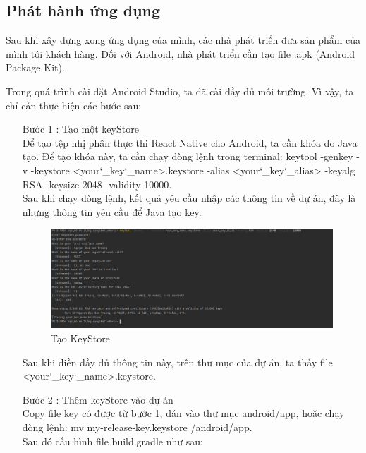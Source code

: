 \subsection{Phát hành ứng dụng}
    Sau khi xây dựng xong ứng dụng của mình, các nhà phát triển đưa sản phẩm của mình tới khách hàng. Đối với Android, nhà phát triển cần tạo file .apk (Android Package Kit).

    Trong quá trình cài đặt Android Studio, ta đã cài đầy đủ môi trường. Vì vậy, ta chỉ cần thực hiện các bước sau:
    \begin{enumerate}
        \item[Bước 1]: Tạo một keyStore\\
        Để tạo tệp nhị phân thực thi React Native cho Android, ta cần khóa do Java tạo. Để tạo khóa này, ta cần chạy dòng lệnh trong terminal: keytool -genkey -v -keystore <your\char`_key\char`_name>.keystore -alias <your\char`_key\char`_alias> -keyalg RSA -keysize 2048 -validity 10000.\\
        Sau khi chạy dòng lệnh, kết quả yêu cầu nhập các thông tin về dự án, đây là nhưng thông tin yêu cầu để Java tạo key.\\
        \begin{figure}[!ht]
            \centering
            \includegraphics[width=1\textwidth]{images/genkeystore.png}
            \caption{Tạo KeyStore}
        \end{figure}
        Sau khi điền đầy đủ thông tin này, trên thư mục của dự án, ta thấy file <your\char`_key\char`_name>.keystore.
        \item[Bước 2]: Thêm keyStore vào dự án\\
        Copy file key có được từ bước 1, dán vào thư mục android/app, hoặc chạy dòng lệnh: mv my-release-key.keystore /android/app.\\
        Sau đó cấu hình file build.gradle như sau:
        \begin{figure}[!ht]
            \centering

\end{figure}
\end{enumerate}
